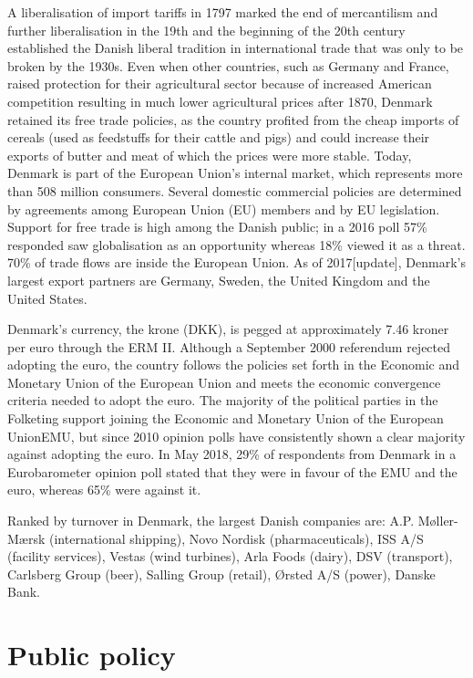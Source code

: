 A liberalisation of import tariffs in 1797 marked the end of
mercantilism and further liberalisation in the 19th and the beginning of
the 20th century established the Danish liberal tradition in
international trade that was only to be broken by the 1930s. Even when
other countries, such as Germany and France, raised protection for their
agricultural sector because of increased American competition resulting
in much lower agricultural prices after 1870, Denmark retained its free
trade policies, as the country profited from the cheap imports of
cereals (used as feedstuffs for their cattle and pigs) and could
increase their exports of butter and meat of which the prices were more
stable. Today, Denmark is part of the European Union's internal market,
which represents more than 508 million consumers. Several domestic
commercial policies are determined by agreements among European Union
(EU) members and by EU legislation. Support for free trade is high among
the Danish public; in a 2016 poll 57\% responded saw globalisation as an
opportunity whereas 18\% viewed it as a threat. 70\% of trade flows are
inside the European Union. As of 2017{[}update{]}, Denmark's largest
export partners are Germany, Sweden, the United Kingdom and the United
States.

Denmark's currency, the krone (DKK), is pegged at approximately 7.46
kroner per euro through the ERM II. Although a September 2000 referendum
rejected adopting the euro, the country follows the policies set forth
in the Economic and Monetary Union of the European Union and meets the
economic convergence criteria needed to adopt the euro. The majority of
the political parties in the Folketing support joining the Economic and
Monetary Union of the European Union\textbar{}EMU, but since 2010
opinion polls have consistently shown a clear majority against adopting
the euro. In May 2018, 29\% of respondents from Denmark in a
Eurobarometer opinion poll stated that they were in favour of the EMU
and the euro, whereas 65\% were against it.

Ranked by turnover in Denmark, the largest Danish companies are: A.P.
Møller-Mærsk (international shipping), Novo Nordisk (pharmaceuticals),
ISS A/S (facility services), Vestas (wind turbines), Arla Foods (dairy),
DSV (transport), Carlsberg Group (beer), Salling Group (retail), Ørsted
A/S (power), Danske Bank.

\section{Public policy}\label{public-policy}

